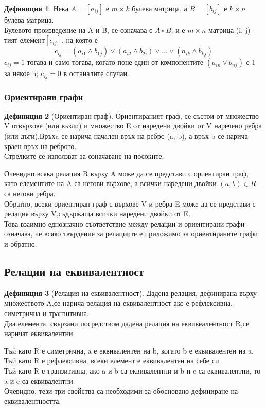 \documentclass[fleqn, 12pt]{article}
\theoremstyle{definition}
\newtheorem{definition}{Дефиниция}[subsection]
\begin{document}
\begin{definition}
Нека $A = [a_{ij}]$ е $m \times k$ булева матрица, а $B = [b_{ij}]$ е $k \times n$ булева матрица.\\
Булевото произведение на A и B, се означава с $A \circ B$, и е $m\times n$ матрица (i, j)-тият елемент$[c_{ij}]$, на която е 
$$c_{ij}= (a_{i1}\land b_{1j}) \lor (a_{i2}\land b_{2i}) \lor ... \lor (a_{ik} \land b_{kj})$$
$c_{ij} = 1$ тогава и само тогава, когато поне един от компонентите $(a_{in}\lor b_{nj})$ е 1 за някое n; $c_{ij}= 0$ в останалите случаи.
\end{definition}

\subsubsection{Ориентирани графи}

\begin{definition}[Ориентиран граф]
Ориентираният граф, се състои от множество V отвърхове (или възли) и множество E от наредени двойки от V наречено ребра (или дъги).Връхa се нарича начален връх на ребро (a, b), а връх b се нарича краен връх на реброто. \\
Стрелките се използват за означаване на посоките.
\end{definition}
Очевидно всяка релация R върху A може да се представи с ориентиран граф, като елементите на A са негови върхове, а всички наредени двойки $(a, b) \in R$ са негови ребра.\\
Обратно, всеки ориентиран граф с върхове V и ребра E може да се представи с релация върху V,съдържаща всички наредени двойки от E.\\
Това взаимно еднозначно съответствие между релации и ориентирани графи означава, че всяко твърдение за релациите е приложимо за ориентираните графи и обратно.

\subsection{Релации на еквивалентност}

\begin{definition}[Релация на еквивалентност]
Дадена релация, дефинирана върху множеството A,се нарича релация на еквивалентност ако е рефлексивна, симетрична и транзитивна. \\
Два елемента, свързани посредством дадена релация на еквивеалентност R,се наричат еквивалентни.
\end{definition}
Тъй като R е симетрична, a е еквивалентен на b, когато b е еквивалентен на a.\\
Тъй като R е рефлексивна, всеки елемент е еквивалентен на себе си.\\
Тъй като R е транзитивна, ако a и b са еквивалентни и b и c са еквивалентни, то a и c са еквивалентни.\\
Очевидно, тези три свойства са необходими за обосновано дефиниране на еквивалентността.
\end{document}
